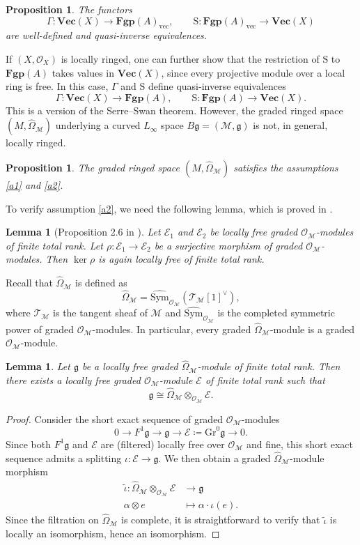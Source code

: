 \documentclass[12pt]{amsart}
\newtheorem{lem}[defn]{Lemma}
\newtheorem{prop}[defn]{Proposition}
\numberwithin{equation}{section}
\theoremstyle{plain}
\newcommand{\fg}{\mathfrak{g}}
\newcommand{\sE}{\mathcal{E}}
\newcommand{\sM}{\mathcal{M}}
\newcommand{\sO}{\mathcal{O}}
\newcommand{\sT}{\mathcal{T}}
\newcommand{\Sym}{\mathrm{Sym}}
\newcommand{\Gr}{\mathrm{Gr}}
\newcommand{\sh}{\mathrm{S}}
\newcommand{\wSym}{\widehat{\Sym}}
\newcommand{\wOmega}{\widehat{\Omega}}
\begin{document}
	\begin{prop}\label{gft}
		The functors
		\[
		\Gamma\colon \mathbf{Vec}(X) \longrightarrow \mathbf{Fgp}(A)_{\mathrm{vec}},
		\qquad
		\sh\colon \mathbf{Fgp}(A)_{\mathrm{vec}} \longrightarrow \mathbf{Vec}(X)
		\]
		are well-defined and quasi-inverse equivalences.
	\end{prop}
	If $(X,\sO_X)$ is locally ringed, one can further show that the restriction of $\sh$ to $\mathbf{Fgp}(A)$ takes values in $\mathbf{Vec}(X)$, since every projective module over a local ring is free.  In this case, $\Gamma$ and $\sh$ define quasi-inverse equivalences
	\[
	\Gamma:\mathbf{Vec}(X)\longrightarrow \mathbf{Fgp}(A),
	\qquad
	\sh:\mathbf{Fgp}(A)\longrightarrow \mathbf{Vec}(X).
	\]
	This is a version of the Serre--Swan theorem. 
	However, the graded ringed space $(M, \wOmega_\sM)$ underlying a curved $L_\infty$ space $B\fg = (\sM, \fg)$ is not, in general, locally ringed.
	
	\begin{prop}\label{kerOmega}
		The graded ringed space $(M, \wOmega_\sM)$ satisfies the assumptions \ref{a1} and \ref{a2}.
	\end{prop}
	To verify assumption \ref{a2}, we need the following lemma, which is proved in \cite{cattaneojiang26}.
	\begin{lem}[Proposition 2.6 in \cite{cattaneojiang26}]\label{kerOM}
		Let $\sE_1$ and $\sE_2$ be locally free graded $\sO_\sM$-modules of finite total rank. Let $\rho\colon \sE_1 \to \sE_2$ be a surjective morphism of graded $\sO_\sM$-modules. Then $\ker \rho$ is again locally free of finite total rank.
	\end{lem}
	Recall that $\wOmega_\sM$ is defined as
	\[
	\wOmega_\sM = \wSym_{\sO_\sM}(\sT_\sM[1]^\vee),
	\]
	where $\sT_\sM$ is the tangent sheaf of $\sM$ and $ \wSym_{\sO_\sM}$ is the completed symmetric power of graded $\sO_\sM$-modules. In particular, every graded $\wOmega_\sM$-module is a graded $\sO_\sM$-module.
	\begin{lem}\label{lkerOmega}
		Let $\fg$ be a locally free graded $\wOmega_\sM$-module of finite total rank. Then there exists a locally free graded $\sO_\sM$-module $\sE$ of finite total rank such that
		\[
		\fg \cong \wOmega_\sM \otimes_{\sO_\sM} \sE.
		\]
	\end{lem}
	\begin{proof}
		Consider the short exact sequence of graded $\sO_\sM$-modules
		\[
		0 \longrightarrow F^1 \fg \longrightarrow \fg \longrightarrow \sE \coloneqq \Gr^0 \fg \longrightarrow 0.
		\]
		Since both $F^1 \fg$ and $\sE$ are (filtered) locally free over $\sO_\sM$ and fine, this short exact sequence admits a splitting $\iota\colon \sE \to \fg$. We then obtain a graded $\wOmega_\sM$-module morphism
		\begin{align*}
			\widetilde{\iota}\colon \wOmega_\sM \otimes_{\sO_\sM} \sE &\longrightarrow \fg \\
			\alpha \otimes e &\longmapsto \alpha \cdot \iota(e).
		\end{align*}
		Since the filtration on $\wOmega_\sM$ is complete, it is straightforward to verify that $\widetilde{\iota}$ is locally an isomorphism, hence an isomorphism.
	\end{proof}
	
\end{document}
